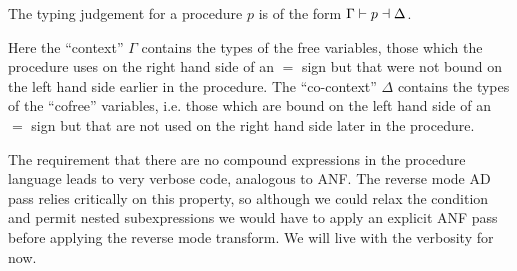 \documentclass[sigplan,review]{acmart}
\begin{document}
The typing judgement for a procedure $p$ is of the form
$\Gamma \vdash p \dashv \Delta$.

Here the ``context'' $\Gamma$ contains the types of the free
variables, those which the procedure uses on the right hand side of an
$=$ sign but that were not bound on the left hand side earlier in the
procedure.  The ``co-context'' $\Delta$ contains the types of the
``cofree'' variables, i.e. those which are bound on the left hand side
of an $=$ sign but that are not used on the right hand side later in
the procedure.

The requirement that there are no compound expressions in the
procedure language leads to very verbose code, analogous to ANF.  The
reverse mode AD pass relies critically on this property, so although
we could relax the condition and permit nested subexpressions we would
have to apply an explicit ANF pass before applying the reverse mode
transform.  We will live with the verbosity for now.
\end{document}
